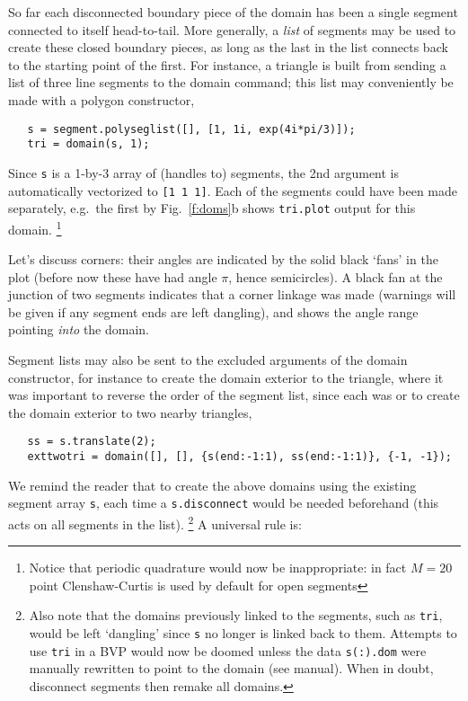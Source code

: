 \documentclass[11pt]{article}
\begin{document}
So far each disconnected boundary piece of the domain
has been a single segment connected to itself head-to-tail.
More generally, a {\em list} of segments may be used to create 
these closed boundary pieces, as long as the last in the list
connects back to the starting point of the first.
For instance, a triangle is built from sending a list of
three line segments to the domain command;
this list may conveniently be made with a polygon constructor,
\begin{verbatim}
   s = segment.polyseglist([], [1, 1i, exp(4i*pi/3)]);
   tri = domain(s, 1);
\end{verbatim}
Since {\tt s} is a 1-by-3 array of (handles to) segments,
the 2nd argument is automatically vectorized to {\tt [1 1 1]}.
Each of the segments could have been made separately, e.g.\ the first by
Fig.~\ref{f:doms}b shows {\tt tri.plot} output for this domain.%
  \footnote{Notice that periodic quadrature would now be inappropriate:
    in fact $M=20$ point Clenshaw-Curtis is used by default for open
    segments}

Let's discuss corners: their angles are indicated by the solid black
`fans' in the plot (before now these have had angle $\pi$, hence semicircles).
A black fan at the junction of two segments indicates that a corner
linkage was made (warnings will be given if any segment ends are left
dangling), and shows the angle range pointing {\em into} the domain.

Segment lists may also be sent to the excluded arguments of the
domain constructor, for instance to create the domain exterior
to the triangle,
where it was important to reverse the order of the segment list,
since each was 
or to create the domain exterior to two nearby triangles,
\begin{verbatim}
   ss = s.translate(2);
   exttwotri = domain([], [], {s(end:-1:1), ss(end:-1:1)}, {-1, -1});
\end{verbatim}
We remind the reader that to create the above domains
using the existing segment array {\tt s}, each time a {\tt s.disconnect}
would be needed beforehand (this acts on all segments in the list).%
  \footnote{Also note that the domains previously linked to the segments, such
    as {\tt tri}, would be left `dangling' since {\tt s} no longer is linked
    back to them. Attempts to use {\tt tri} in a BVP would now be doomed
    unless the data {\tt s(:).dom} were manually rewritten to point to
    the domain (see manual). When in doubt, disconnect segments then remake
    all domains.}
A universal rule is:
\begin{center}\end{center}
\end{document}
